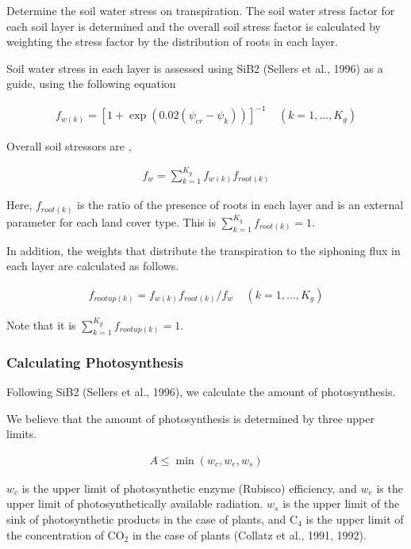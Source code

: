 Determine the soil water stress on transpiration. The soil water stress
factor for each soil layer is determined and the overall soil stress
factor is calculated by weighting the stress factor by the distribution
of roots in each layer.

Soil water stress in each layer is assessed using SiB2 (Sellers et al.,
1996) as a guide, using the following equation

\begin{eqnarray}
 f_{w(k)} = [ 1 + \exp( 0.02 (\psi_{cr} - \psi_{k}) ) ]^{-1}
\ \ \ \ \ (k=1,\ldots,K_g)
\end{eqnarray}

Overall soil stressors are ,

\begin{eqnarray}
 f_w = \sum_{k=1}^{K_g} f_{w(k)} f_{root(k)}
\end{eqnarray}

Here, \(f_{root(k)}\) is the ratio of the presence of roots in each
layer and is an external parameter for each land cover type. This is
\(\sum_{k=1}^{K_g} f_{root(k)}=1\).

In addition, the weights that distribute the transpiration to the
siphoning flux in each layer are calculated as follows.

\begin{eqnarray}
 f_{rootup(k)} = f_{w(k)} f_{root(k)} / f_w
\ \ \ \ \ (k=1,\ldots,K_g)
\end{eqnarray}

Note that it is \(\sum_{k=1}^{K_g} f_{rootup(k)} = 1\).

\hypertarget{calculating-photosynthesis}{%
\subsubsection{Calculating
Photosynthesis}\label{calculating-photosynthesis}}

Following SiB2 (Sellers et al., 1996), we calculate the amount of
photosynthesis.

We believe that the amount of photosynthesis is determined by three
upper limits.

\begin{eqnarray}
 A \leq \min( w_c, w_e, w_s) 
\end{eqnarray}

\(w_c\) is the upper limit of photosynthetic enzyme (Rubisco)
efficiency, and \(w_e\) is the upper limit of photosynthetically
available radiation. \(w_s\) is the upper limit of the sink of
photosynthetic products in the case of plants, and C\(_4\) is the upper
limit of the concentration of CO\(_2\) in the case of plants (Collatz et
al., 1991, 1992).

